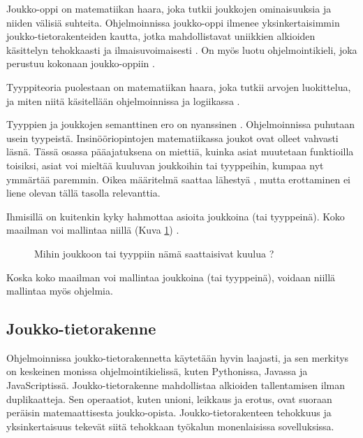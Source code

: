 Joukko-oppi on matematiikan haara, joka tutkii joukkojen ominaisuuksia ja niiden välisiä suhteita. Ohjelmoinnissa joukko-oppi ilmenee yksinkertaisimmin joukko-tietorakenteiden kautta, jotka mahdollistavat uniikkien alkioiden käsittelyn tehokkaasti ja ilmaisuvoimaisesti \cite{mdn_set,mdn_set_methods}. On myös luotu ohjelmointikieli, joka perustuu kokonaan joukko-oppiin \cite{SETL_SET_LANGUAGE}.

Tyyppiteoria puolestaan on matematiikan haara, joka tutkii arvojen luokittelua, ja miten niitä käsitellään ohjelmoinnissa ja logiikassa \cite{type_theory,algebraic_data_types}.

Tyyppien ja joukkojen semanttinen ero on nyanssinen \cite{type_vs_set}. Ohjelmoinnissa puhutaan usein tyypeistä. Insinööriopintojen matematiikassa joukot ovat olleet vahvasti läsnä. Tässä osassa pääajatuksena on miettiä, kuinka asiat muutetaan funktioilla toisiksi, asiat voi mieltää kuuluvan joukkoihin tai tyyppeihin, kumpaa nyt ymmärtää paremmin. Oikea määritelmä saattaa lähestyä , mutta erottaminen ei liene olevan tällä tasolla relevanttia.

Ihmisillä on kuitenkin kyky hahmottaa asioita joukkoina (tai tyyppeinä). Koko maailman voi mallintaa niillä (Kuva \ref{fig:fruit_set}) \cite{algebraic_data_types}.

\begin{figure}[ht]
    \centering
    \caption{Mihin joukkoon tai tyyppiin nämä saattaisivat kuulua \cite{viljofruits}?}
    \label{fig:fruit_set}
\end{figure}

Koska koko maailman voi mallintaa joukkoina (tai tyyppeinä), voidaan niillä mallintaa myös ohjelmia.


\subsection{Joukko-tietorakenne}

Ohjelmoinnissa joukko-tietorakennetta käytetään hyvin laajasti, ja sen merkitys on keskeinen monissa ohjelmointikielissä, kuten Pythonissa, Javassa ja JavaScriptissä. Joukko-tietorakenne mahdollistaa alkioiden tallentamisen ilman duplikaatteja. Sen operaatiot, kuten unioni, leikkaus ja erotus, ovat suoraan peräisin matemaattisesta joukko-opista. Joukko-tietorakenteen tehokkuus ja yksinkertaisuus tekevät siitä tehokkaan työkalun monenlaisissa sovelluksissa. \citep{mdn_set,ecma_spec}

